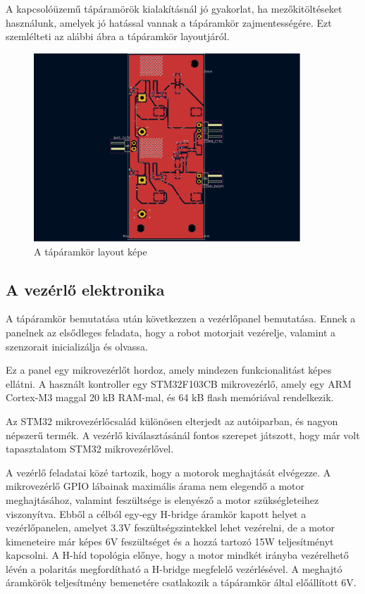 A kapcsolóüzemű tápáramörök kialakításnál jó gyakorlat, ha mezőkitöltéseket
használunk, amelyek jó hatással vannak a tápáramkör zajmentességére. Ezt
szemlélteti az alábbi ábra a tápáramkör layoutjáról.

\begin{figure}
  \centering
  \includegraphics[width=100mm, keepaspectratio]{figures/ch1/power-supply-unit-layout.png}
  \caption{A tápáramkör layout képe}
  \label{fig:pwr_layout}
\end{figure}

\subsection{A vezérlő elektronika}
A tápáramkör bemutatása után következzen a vezérlőpanel bemutatása. Ennek a
panelnek az elsődleges feladata, hogy a robot motorjait vezérelje, valamint
a szenzorait inicializálja és olvassa.

Ez a panel egy mikrovezérlőt hordoz, amely mindezen funkcionalitást képes
ellátni. A használt kontroller egy STM32F103CB mikrovezérlő, amely egy
ARM Cortex-M3 maggal 20 kB RAM-mal, és 64 kB flash memóriával rendelkezik.

Az STM32 mikrovezérlőcsalád különösen elterjedt az autóiparban, és nagyon
népszerű termék. A vezérlő kiválasztásánál fontos szerepet játszott, hogy már
volt tapasztalatom STM32 mikrovezérlővel.

\medskip

A vezérlő feladatai közé tartozik, hogy a motorok meghajtását elvégezze. A
mikrovezérlő GPIO lábainak maximális árama nem elegendő a motor meghajtásához,
valamint feszültsége is elenyésző a motor szükségleteihez viszonyítva. Ebből a
célból egy-egy H-bridge áramkör kapott helyet a vezérlőpanelen, amelyet 3.3V
feszültségszintekkel lehet vezérelni, de a motor kimeneteire már képes 6V
feszültséget és a hozzá tartozó 15W teljesítményt kapcsolni. A H-híd topológia
előnye, hogy a motor mindkét irányba vezérelhető lévén a polaritás megfordítható
a H-bridge megfelelő vezérlésével. A meghajtó áramkörök teljesítmény bemenetére
csatlakozik a tápáramkör által előállított 6V.

